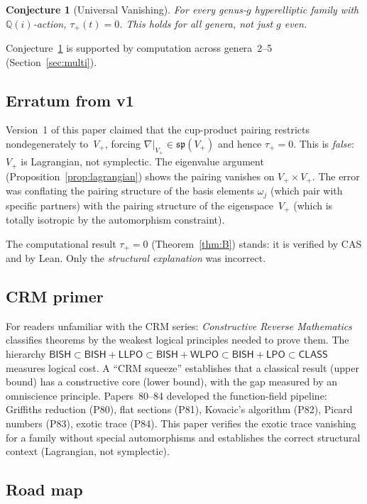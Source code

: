 \documentclass[11pt]{article}
\theoremstyle{plain}
\newtheorem{conjecture}[theorem]{Conjecture}
\theoremstyle{definition}
\theoremstyle{remark}
\newcommand{\Q}{\mathbb{Q}}
\newcommand{\BISH}{\ensuremath{\mathsf{BISH}}}
\newcommand{\LPO}{\ensuremath{\mathsf{LPO}}}
\newcommand{\WLPO}{\ensuremath{\mathsf{WLPO}}}
\newcommand{\LLPO}{\ensuremath{\mathsf{LLPO}}}
\newcommand{\CLASS}{\ensuremath{\mathsf{CLASS}}}
\begin{document}
\begin{conjecture}[Universal Vanishing]\label{conj:universal}
For \emph{every} genus-$g$ hyperelliptic family with $\Q(i)$-action,
$\tau_+(t) = 0$.  This holds for all genera, not just $g$ even.
\end{conjecture}

Conjecture~\ref{conj:universal} is supported by computation across
genera~2--5 (Section~\ref{sec:multi}).

\subsection{Erratum from v1}\label{sec:erratum}

Version~1 of this paper claimed that the cup-product pairing
restricts nondegenerately to~$V_+$, forcing
$\nabla|_{V_+} \in \mathfrak{sp}(V_+)$ and hence $\tau_+ = 0$.
This is \emph{false}: $V_+$ is Lagrangian, not symplectic.  The
eigenvalue argument (Proposition~\ref{prop:lagrangian}) shows the
pairing vanishes on $V_+ \times V_+$.  The error was conflating the
pairing structure of the basis elements $\omega_j$ (which pair with
specific partners) with the pairing structure of the eigenspace~$V_+$
(which is totally isotropic by the automorphism constraint).

The computational result $\tau_+ = 0$ (Theorem~\ref{thm:B}) stands:
it is verified by CAS and by Lean.  Only the \emph{structural
explanation} was incorrect.

\subsection{CRM primer}\label{sec:primer}

For readers unfamiliar with the CRM series: \emph{Constructive Reverse
Mathematics} classifies theorems by the weakest logical principles
needed to prove them. The hierarchy $\BISH \subset \BISH + \LLPO
\subset \BISH + \WLPO \subset \BISH + \LPO \subset \CLASS$ measures
logical cost. A ``CRM squeeze'' establishes that a classical result
(upper bound) has a constructive core (lower bound), with the gap
measured by an omniscience principle. Papers~80--84 developed the
function-field pipeline: Griffiths reduction (P80), flat sections
(P81), Kovacic's algorithm (P82), Picard numbers (P83), exotic
trace (P84).  This paper verifies the exotic trace vanishing for a
family without special automorphisms and establishes the correct
structural context (Lagrangian, not symplectic).

\subsection{Road map}
\end{document}
